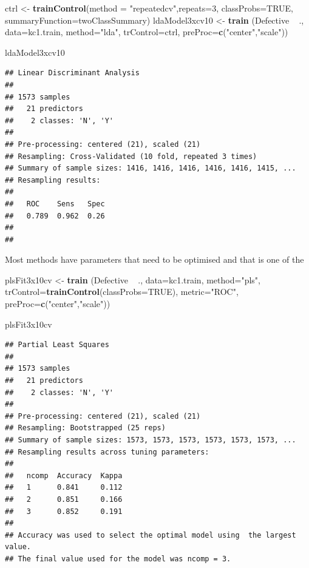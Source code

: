 \documentclass[]{book}
\newenvironment{Shaded}{\begin{snugshade}}{\end{snugshade}}
\newcommand{\KeywordTok}[1]{\textcolor[rgb]{0.13,0.29,0.53}{\textbf{{#1}}}}
\newcommand{\DataTypeTok}[1]{\textcolor[rgb]{0.13,0.29,0.53}{{#1}}}
\newcommand{\DecValTok}[1]{\textcolor[rgb]{0.00,0.00,0.81}{{#1}}}
\newcommand{\StringTok}[1]{\textcolor[rgb]{0.31,0.60,0.02}{{#1}}}
\newcommand{\OtherTok}[1]{\textcolor[rgb]{0.56,0.35,0.01}{{#1}}}
\newcommand{\NormalTok}[1]{{#1}}
\begin{document}
\begin{Shaded}
\begin{Highlighting}[]
\NormalTok{ctrl <-}\StringTok{ }\KeywordTok{trainControl}\NormalTok{(}\DataTypeTok{method =} \StringTok{"repeatedcv"}\NormalTok{,}\DataTypeTok{repeats=}\DecValTok{3}\NormalTok{, }\DataTypeTok{classProbs=}\OtherTok{TRUE}\NormalTok{,}
\DataTypeTok{summaryFunction=}\NormalTok{twoClassSummary)}
\NormalTok{ldaModel3xcv10 <-}\StringTok{ }\KeywordTok{train} \NormalTok{(Defective ~}\StringTok{ }\NormalTok{., }\DataTypeTok{data=}\NormalTok{kc1.train, }\DataTypeTok{method=}\StringTok{"lda"}\NormalTok{, }\DataTypeTok{trControl=}\NormalTok{ctrl, }\DataTypeTok{preProc=}\KeywordTok{c}\NormalTok{(}\StringTok{"center"}\NormalTok{,}\StringTok{"scale"}\NormalTok{))}

\NormalTok{ldaModel3xcv10}
\end{Highlighting}
\end{Shaded}

\begin{verbatim}
## Linear Discriminant Analysis 
## 
## 1573 samples
##   21 predictors
##    2 classes: 'N', 'Y' 
## 
## Pre-processing: centered (21), scaled (21) 
## Resampling: Cross-Validated (10 fold, repeated 3 times) 
## Summary of sample sizes: 1416, 1416, 1416, 1416, 1416, 1415, ... 
## Resampling results:
## 
##   ROC    Sens   Spec
##   0.789  0.962  0.26
## 
## 
\end{verbatim}

Most methods have parameters that need to be optimised and that is one
of the

\begin{Shaded}
\begin{Highlighting}[]
\NormalTok{plsFit3x10cv <-}\StringTok{ }\KeywordTok{train} \NormalTok{(Defective ~}\StringTok{ }\NormalTok{., }\DataTypeTok{data=}\NormalTok{kc1.train, }\DataTypeTok{method=}\StringTok{"pls"}\NormalTok{, }\DataTypeTok{trControl=}\KeywordTok{trainControl}\NormalTok{(}\DataTypeTok{classProbs=}\OtherTok{TRUE}\NormalTok{), }\DataTypeTok{metric=}\StringTok{"ROC"}\NormalTok{, }\DataTypeTok{preProc=}\KeywordTok{c}\NormalTok{(}\StringTok{"center"}\NormalTok{,}\StringTok{"scale"}\NormalTok{))}

\NormalTok{plsFit3x10cv}
\end{Highlighting}
\end{Shaded}

\begin{verbatim}
## Partial Least Squares 
## 
## 1573 samples
##   21 predictors
##    2 classes: 'N', 'Y' 
## 
## Pre-processing: centered (21), scaled (21) 
## Resampling: Bootstrapped (25 reps) 
## Summary of sample sizes: 1573, 1573, 1573, 1573, 1573, 1573, ... 
## Resampling results across tuning parameters:
## 
##   ncomp  Accuracy  Kappa
##   1      0.841     0.112
##   2      0.851     0.166
##   3      0.852     0.191
## 
## Accuracy was used to select the optimal model using  the largest value.
## The final value used for the model was ncomp = 3.
\end{verbatim}
\end{document}
